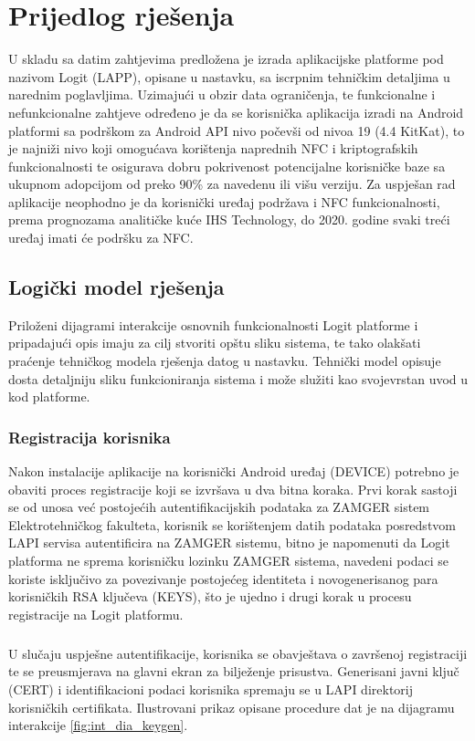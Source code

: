 \chapter{Prijedlog rješenja} \label{chapter:solution}
U skladu sa datim zahtjevima predložena je izrada aplikacijske platforme pod nazivom Logit (\gls{LAPP}), opisane u nastavku, sa iscrpnim tehničkim detaljima u narednim poglavljima. Uzimajući u obzir data ograničenja, te funkcionalne i nefunkcionalne zahtjeve određeno je da se korisnička aplikacija izradi na Android platformi sa podrškom za Android API nivo počevši od nivoa 19 (4.4 KitKat), to je najniži nivo koji omogućava korištenja naprednih NFC i kriptografskih funkcionalnosti te osigurava dobru pokrivenost potencijalne korisničke baze sa ukupnom adopcijom od preko 90\% za navedenu ili višu verziju\cite{droidstats}. Za uspješan rad aplikacije neophodno je da korisnički uređaj podržava i NFC funkcionalnosti, prema prognozama analitičke kuće IHS Technology, do 2020. godine svaki treći uređaj imati će podršku za NFC.\cite{nfcforecast}

\section{Logički model rješenja}
Priloženi dijagrami interakcije osnovnih funkcionalnosti Logit platforme i pripadajući opis imaju za cilj stvoriti opštu sliku sistema, te tako olakšati praćenje tehničkog modela rješenja datog u nastavku. Tehnički model opisuje dosta detaljniju sliku funkcioniranja sistema i može služiti kao svojevrstan uvod u kod platforme.

\subsection*{Registracija korisnika}
Nakon instalacije aplikacije na korisnički Android uređaj (DEVICE) potrebno je obaviti proces registracije koji se izvršava u dva bitna koraka. Prvi korak sastoji se od unosa već postojećih autentifikacijskih podataka za ZAMGER sistem Elektrotehničkog fakulteta, korisnik se korištenjem datih podataka posredstvom LAPI servisa autentificira na ZAMGER sistemu, bitno je napomenuti da Logit platforma ne sprema korisničku lozinku ZAMGER sistema, navedeni podaci se koriste isključivo za povezivanje postojećeg identiteta i novogenerisanog para korisničkih RSA ključeva (KEYS), što je ujedno i drugi korak u procesu registracije na Logit platformu.

\paragraph*{}
U slučaju uspješne autentifikacije, korisnika se obavještava o završenoj registraciji te se preusmjerava na glavni ekran za bilježenje prisustva. Generisani javni ključ (CERT) i identifikacioni podaci korisnika spremaju se u LAPI direktorij korisničkih certifikata. Ilustrovani prikaz opisane procedure dat je na dijagramu interakcije \ref{fig:int_dia_keygen}.

